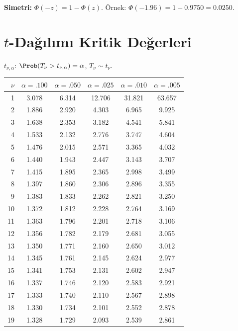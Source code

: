 \noindent\textbf{Simetri:} $\Phi(-z)=1-\Phi(z)$. Örnek: $\Phi(-1.96)=1-0.9750=0.0250$.

\section{$t$-Dağılımı Kritik Değerleri}
\label{app:t_tablo}

$t_{\nu,\alpha}$: $\Prob(T_\nu > t_{\nu,\alpha}) = \alpha$, $T_\nu \sim t_\nu$.

\begin{center}
\small
\renewcommand{\arraystretch}{1.12}
\begin{tabular}{r|ccccc}
\hline
$\nu$ & $\alpha=.100$ & $\alpha=.050$ & $\alpha=.025$ & $\alpha=.010$ & $\alpha=.005$ \\
\hline
1  & 3.078 & 6.314 & 12.706 & 31.821 & 63.657 \\
2  & 1.886 & 2.920 &  4.303 &  6.965 &  9.925 \\
3  & 1.638 & 2.353 &  3.182 &  4.541 &  5.841 \\
4  & 1.533 & 2.132 &  2.776 &  3.747 &  4.604 \\
5  & 1.476 & 2.015 &  2.571 &  3.365 &  4.032 \\
6  & 1.440 & 1.943 &  2.447 &  3.143 &  3.707 \\
7  & 1.415 & 1.895 &  2.365 &  2.998 &  3.499 \\
8  & 1.397 & 1.860 &  2.306 &  2.896 &  3.355 \\
9  & 1.383 & 1.833 &  2.262 &  2.821 &  3.250 \\
10 & 1.372 & 1.812 &  2.228 &  2.764 &  3.169 \\
11 & 1.363 & 1.796 &  2.201 &  2.718 &  3.106 \\
12 & 1.356 & 1.782 &  2.179 &  2.681 &  3.055 \\
13 & 1.350 & 1.771 &  2.160 &  2.650 &  3.012 \\
14 & 1.345 & 1.761 &  2.145 &  2.624 &  2.977 \\
15 & 1.341 & 1.753 &  2.131 &  2.602 &  2.947 \\
16 & 1.337 & 1.746 &  2.120 &  2.583 &  2.921 \\
17 & 1.333 & 1.740 &  2.110 &  2.567 &  2.898 \\
18 & 1.330 & 1.734 &  2.101 &  2.552 &  2.878 \\
19 & 1.328 & 1.729 &  2.093 &  2.539 &  2.861 \\

\end{tabular}
\end{center}
